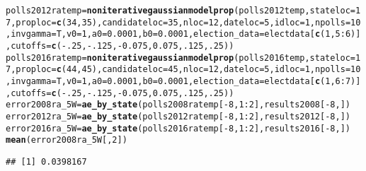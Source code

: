 \documentclass{article}\usepackage[]{graphicx}\usepackage[]{color}
\makeatletter
\newcommand{\hlnum}[1]{\textcolor[rgb]{0.686,0.059,0.569}{#1}}%
\newcommand{\hlopt}[1]{\textcolor[rgb]{0,0,0}{#1}}%
\newcommand{\hlstd}[1]{\textcolor[rgb]{0.345,0.345,0.345}{#1}}%
\newcommand{\hlkwb}[1]{\textcolor[rgb]{0.69,0.353,0.396}{#1}}%
\newcommand{\hlkwc}[1]{\textcolor[rgb]{0.333,0.667,0.333}{#1}}%
\newcommand{\hlkwd}[1]{\textcolor[rgb]{0.737,0.353,0.396}{\textbf{#1}}}%
\newenvironment{kframe}{%
 \def\at@end@of@kframe{}%
 \ifinner\ifhmode%
  \def\at@end@of@kframe{\end{minipage}}%
  \begin{minipage}{\columnwidth}%
 \fi\fi%
 \def\FrameCommand##1{\hskip\@totalleftmargin \hskip-\fboxsep
 \colorbox{shadecolor}{##1}\hskip-\fboxsep
     \hskip-\linewidth \hskip-\@totalleftmargin \hskip\columnwidth}%
 \MakeFramed {\advance\hsize-\width
   \@totalleftmargin\z@ \linewidth\hsize
   \@setminipage}}%
 {\par\unskip\endMakeFramed%
 \at@end@of@kframe}
\newenvironment{knitrout}{}{} %
\makeatother
\begin{document}
\begin{knitrout}
\begin{kframe}
\begin{alltt}
\hlstd{polls2012ratemp} \hlkwb{=} \hlkwd{noniterativegaussianmodelprop}\hlstd{(polls2012temp,} \hlkwc{stateloc} \hlstd{=} \hlnum{17}\hlstd{,} \hlkwc{proploc} \hlstd{=} \hlkwd{c}\hlstd{(}\hlnum{34}\hlstd{,} \hlnum{35}\hlstd{),} \hlkwc{candidateloc} \hlstd{=} \hlnum{35}\hlstd{,}  \hlkwc{nloc} \hlstd{=} \hlnum{12}\hlstd{,} \hlkwc{dateloc} \hlstd{=} \hlnum{5}\hlstd{,} \hlkwc{idloc} \hlstd{=} \hlnum{1}\hlstd{,}  \hlkwc{npolls} \hlstd{=} \hlnum{10}\hlstd{,}\hlkwc{invgamma} \hlstd{= T,} \hlkwc{v0}\hlstd{=}\hlnum{1}\hlstd{,} \hlkwc{a0}\hlstd{=}\hlnum{0.0001}\hlstd{,} \hlkwc{b0}\hlstd{=}\hlnum{0.0001}\hlstd{,}  \hlkwc{election_data} \hlstd{= electdata[}\hlkwd{c}\hlstd{(}\hlnum{1}\hlstd{,} \hlnum{5}\hlopt{:}\hlnum{6}\hlstd{)],} \hlkwc{cutoffs} \hlstd{=} \hlkwd{c}\hlstd{(}\hlopt{-}\hlnum{.25}\hlstd{,} \hlopt{-}\hlnum{.125}\hlstd{,} \hlopt{-}\hlnum{0.075}\hlstd{,} \hlnum{0.075}\hlstd{,} \hlnum{.125}\hlstd{,} \hlnum{.25}\hlstd{))}
\hlstd{polls2016ratemp} \hlkwb{=} \hlkwd{noniterativegaussianmodelprop}\hlstd{(polls2016temp,} \hlkwc{stateloc} \hlstd{=} \hlnum{17}\hlstd{,} \hlkwc{proploc} \hlstd{=} \hlkwd{c}\hlstd{(}\hlnum{44}\hlstd{,} \hlnum{45}\hlstd{),} \hlkwc{candidateloc} \hlstd{=} \hlnum{45}\hlstd{,} \hlkwc{nloc} \hlstd{=} \hlnum{12}\hlstd{,} \hlkwc{dateloc} \hlstd{=} \hlnum{5}\hlstd{,} \hlkwc{idloc} \hlstd{=} \hlnum{1}\hlstd{,}\hlkwc{npolls} \hlstd{=} \hlnum{10}\hlstd{,} \hlkwc{invgamma} \hlstd{= T,} \hlkwc{v0}\hlstd{=}\hlnum{1}\hlstd{,} \hlkwc{a0}\hlstd{=}\hlnum{0.0001}\hlstd{,} \hlkwc{b0}\hlstd{=}\hlnum{0.0001}\hlstd{,} \hlkwc{election_data} \hlstd{= electdata[}\hlkwd{c}\hlstd{(}\hlnum{1}\hlstd{,} \hlnum{6}\hlopt{:}\hlnum{7}\hlstd{)],} \hlkwc{cutoffs} \hlstd{=} \hlkwd{c}\hlstd{(}\hlopt{-}\hlnum{.25}\hlstd{,} \hlopt{-}\hlnum{.125}\hlstd{,} \hlopt{-}\hlnum{0.075}\hlstd{,} \hlnum{0.075}\hlstd{,} \hlnum{.125}\hlstd{,} \hlnum{.25}\hlstd{))}
\hlstd{error2008ra_5W} \hlkwb{=} \hlkwd{ae_by_state}\hlstd{(polls2008ratemp[}\hlopt{-}\hlnum{8}\hlstd{,} \hlnum{1}\hlopt{:}\hlnum{2}\hlstd{], results2008[}\hlopt{-}\hlnum{8}\hlstd{, ])}
\hlstd{error2012ra_5W} \hlkwb{=} \hlkwd{ae_by_state}\hlstd{(polls2012ratemp[}\hlopt{-}\hlnum{8}\hlstd{,} \hlnum{1}\hlopt{:}\hlnum{2}\hlstd{], results2012[}\hlopt{-}\hlnum{8}\hlstd{, ])}
\hlstd{error2016ra_5W} \hlkwb{=} \hlkwd{ae_by_state}\hlstd{(polls2016ratemp[}\hlopt{-}\hlnum{8}\hlstd{,} \hlnum{1}\hlopt{:}\hlnum{2}\hlstd{], results2016[}\hlopt{-}\hlnum{8}\hlstd{, ])}
\hlkwd{mean}\hlstd{(error2008ra_5W[,}\hlnum{2}\hlstd{])}
\end{alltt}
\begin{verbatim}
## [1] 0.0398167

\end{verbatim}
\end{kframe}
\end{knitrout}
\end{document}
